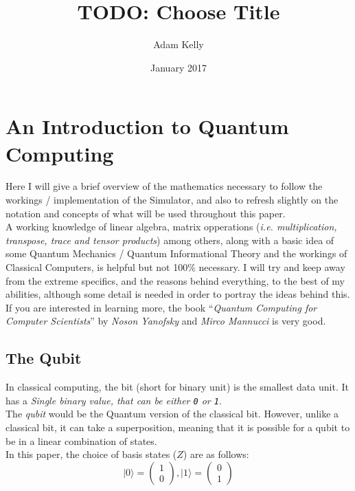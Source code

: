 \documentclass{report}
\title{TODO: Choose Title}
\author{Adam Kelly}
\date{January 2017}
\begin{document}
\begin{titlepage}
\maketitle
\end{titlepage}

\newpage
\tableofcontents
\newpage

\section{An Introduction to Quantum Computing}

Here I will give a brief overview of the mathematics necessary to follow
the workings / implementation of the Simulator, and also to refresh
slightly on the notation and concepts of what will be used throughout
this paper.\\
A working knowledge of linear algebra, matrix opperations (\emph{i.e.
multiplication, transpose, trace and tensor products}) among others,
along with a basic idea of some Quantum Mechanics / Quantum
Informational Theory and the workings of Classical Computers, is helpful
but not 100\% necessary. I will try and keep away from the extreme
specifics, and the reasons behind everything, to the best of my
abilities, although some detail is needed in order to portray the ideas
behind this. If you are interested in learning more, the book
``\emph{Quantum Computing for Computer Scientists}'' by \emph{Noson
Yanofsky} and \emph{Mirco Mannucci} is very good.

\subsection{The Qubit}

In classical computing, the bit (short for binary unit) is the smallest
data unit. It has a \emph{Single binary value, that can be either
\texttt{0} or \texttt{1}}.\\
The \emph{qubit} would be the Quantum version of the classical bit.
However, unlike a classical bit, it can take a superposition, meaning
that it is possible for a qubit to be in a linear combination of
states.\\
In this paper, the choice of basis states (\(Z\)) are as follows:
\begin{equation}
	\lvert0\rangle =\left( \begin{matrix} 1\\ 0 \end{matrix} \right), \lvert1\rangle =\left( \begin{matrix} 0\\ 1\end{matrix} \right)
\end{equation}
\end{document}

